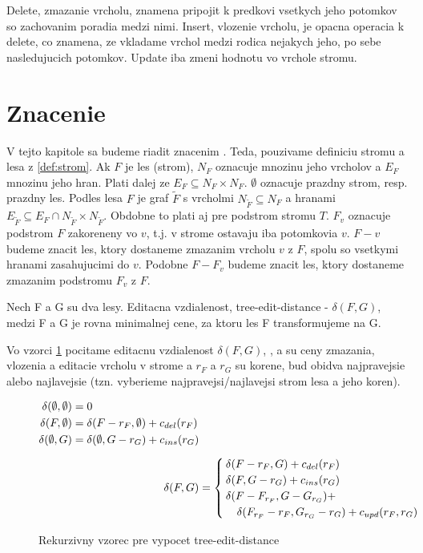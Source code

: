 Delete, zmazanie vrcholu, znamena pripojit k predkovi vsetkych jeho potomkov so
zachovanim poradia medzi nimi. Insert, vlozenie vrcholu, je opacna operacia k
delete, co znamena, ze vkladame vrchol medzi rodica nejakych jeho, po sebe
nasledujucich potomkov. Update iba zmeni hodnotu vo vrchole stromu.

\section{Znacenie}

V tejto kapitole sa budeme riadit znacenim \citet{RTED}. Teda, pouzivame definiciu
stromu a lesa z \ref{def:strom}. Ak $F$ je les (strom), $N_F$ oznacuje mnozinu jeho vrcholov a $E_F$
mnozinu jeho hran. Plati dalej ze $E_F \subseteq N_F \times N_F$. $\emptyset$ oznacuje
prazdny strom, resp. prazdny les. Podles lesa $F$ je graf $\tilde{F}$ s vrcholmi
$N_{\tilde{F}} \subseteq N_F$ a hranami $E_{\tilde{F}} \subseteq E_F \cap N_{\tilde{F}} \times N_{\tilde{F}}$.
Obdobne to plati aj pre podstrom stromu $T$.
$F_{v}$ oznacuje podstrom $F$ zakoreneny vo $v$, t.j. v strome ostavaju iba potomkovia $v$.
$F - v$ budeme znacit les, ktory dostaneme zmazanim vrcholu $v$ z $F$, spolu so vsetkymi hranami
zasahujucimi do $v$. Podobne $F - F_{v}$ budeme znacit les, ktory dostaneme zmazanim podstromu
$F_{v}$ z $F$.

\begin{definice}
	Nech F a G su dva lesy. Editacna vzdialenost, tree-edit-distance - $\delta(F, G)$,
	medzi F a G je rovna minimalnej cene, za ktoru les F transformujeme na G.
\end{definice}

Vo vzorci \ref{eq:ted} pocitame editacnu vzdialenost $\delta(F, G)$,
\Cdel, \Cins a \Cupd su ceny zmazania, vlozenia a editacie vrcholu v strome
a $r_{F}$ a $r_{G}$ su korene, bud obidva najpravejsie alebo najlavejsie (tzn. vyberieme
najpravejsi/najlavejsi strom lesa a jeho koren).

\begin{figure}[H]\label{eq:ted}
\begin{subequations}
\begin{align}
	\begin{split}
	\delta(\emptyset, \emptyset) &=
		0
		\\
	\delta(F, \emptyset) &=
		\delta(F - r_{F}, \emptyset) + c_{del}(r_{F})
		\\
	\delta(\emptyset, G) &=
		\delta(\emptyset, G - r_{G}) + c_{ins}(r_{G})
	\end{split}
	\\[1ex]
	\delta(F, G) &=
		\begin{cases}
			\delta(F - r_{F}, G) + c_{del}(r_{F}) \\
			\delta(F, G - r_{G}) + c_{ins}(r_{G}) \\
			\delta(F - F_{r_{F}}, G - G_{r_{G}}) + \\
				\quad \delta(F_{r_{F}} - r_{F}, G_{r_{G}} - r_{G}) + c_{upd}(r_{F}, r_{G})
		\end{cases}
\end{align}
\end{subequations}
\caption{Rekurzivny vzorec pre vypocet tree-edit-distance}
\end{figure}


